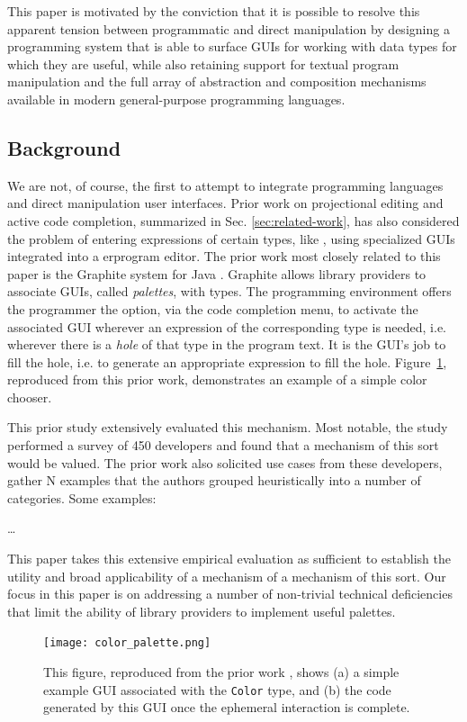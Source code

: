 This paper is motivated by the conviction that it is possible to resolve this apparent tension between 
programmatic and direct manipulation by designing a programming system that 
is able to surface GUIs for working with data types for which 
they are useful, while also retaining support for textual program manipulation  
and the full array of abstraction and composition mechanisms
available in modern general-purpose programming languages.

\subsection{Background}
We are not, of course, the first to attempt to integrate   
programming languages and direct manipulation user interfaces. 
Prior work on projectional editing
and active code completion, summarized in Sec. \ref{sec:related-work}, 
has also considered the problem of entering expressions 
of certain types, like , 
using specialized GUIs integrated into a erprogram editor. 
The prior work most closely related to this paper is the {Graphite} system for Java \cite{DBLP:conf/icse/OmarYLM12}.
Graphite allows library providers to associate GUIs, called \emph{palettes}, with types. 
The programming environment offers the programmer the option, via the code completion menu, 
to activate the associated GUI wherever an expression of the corresponding type is needed, 
i.e. wherever there is a \emph{hole} of that type in the program text. 
It is the GUI's job to fill the hole, i.e. to generate an 
appropriate expression to fill the hole. 
Figure~\ref{fig:color}, reproduced from this prior work, demonstrates an example of a simple color chooser.

This prior study extensively evaluated this mechanism. Most notable, the study 
performed a survey of 450 developers and found
that a mechanism of this sort would be valued. The prior work also solicited use cases from these
developers, gather N examples that the authors grouped heuristically into a number of categories. Some examples:

\dots

This paper takes this extensive empirical evaluation as sufficient to establish the utility and broad applicability of a mechanism
of a mechanism of this sort. Our focus in this paper is on addressing a number of non-trivial technical 
deficiencies that limit the ability of library providers to implement useful palettes. 

\begin{figure}
\begin{center}
\texttt{[image: color\_palette.png]}\end{center}
\caption{This figure, reproduced from the prior work \cite{DBLP:conf/icse/OmarYLM12}, shows (a) a simple example GUI associated with the \texttt{Color} type, and (b) the code generated by this GUI once the ephemeral interaction is complete.}
\label{fig:color}
\end{figure}

